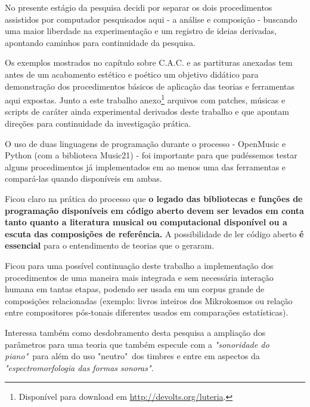 \documentclass[
	12pt,				%
	openright,			%
	twoside,			%
	a4paper,			%
	english,			%
	french,				%
	spanish,			%
	brazil				%
	]{abntex2}
\begin{document}
No presente estágio da pesquisa decidi por separar os dois procedimentos assistidos por computador pesquisados aqui - a análise e composição - buscando uma maior liberdade na experimentação e um registro de ideias derivadas, apontando caminhos para continuidade da pesquisa.

Os exemplos mostrados no capítulo sobre C.A.C. e as partituras anexadas tem antes de um acabamento estético e poético um objetivo didático para demonstração dos procedimentos básicos de aplicação das teorias e ferramentas aqui expostas. Junto a este trabalho anexo\footnote{Disponível para download em \url{http://devolts.org/luteria}.} arquivos com patches, músicas e scripts de caráter ainda experimental derivados deste trabalho e que apontam direções para continuidade da investigação prática.

O uso de duas linguagens de programação durante o processo - OpenMusic e Python (com a biblioteca Music21)  - foi importante para que pudéssemos testar alguns procedimentos já implementados em ao menos uma das ferramentas e compará-las quando disponíveis em ambas. 

Ficou claro na prática do processo que \textbf{o legado das bibliotecas e funções de programação disponíveis em código aberto devem ser levados em conta tanto quanto a literatura musical ou computacional disponível ou a escuta das composições de referência.} A possibilidade de ler código aberto\textbf{ é essencial} para o entendimento de teorias que o geraram.

Ficou para uma possível continuação deste trabalho a implementação dos procedimentos de uma maneira mais integrada e sem necessária interação humana em tantas etapas, podendo ser usada em um corpus grande de composições relacionadas (exemplo: livros inteiros dos Mikrokosmos ou relação entre compositores pós-tonais diferentes usados em comparações estatísticas). 

Interessa também como desdobramento desta pesquisa a ampliação dos parâmetros para uma teoria que também especule com a \textit{"sonoridade do piano"}\cite{guigue2012}\ para além do uso "neutro"\ dos timbres e entre em aspectos da \textit{"espectromorfologia das formas sonoras"}.\cite{smalley1997spectromorphology}







\postextual
\end{document}
